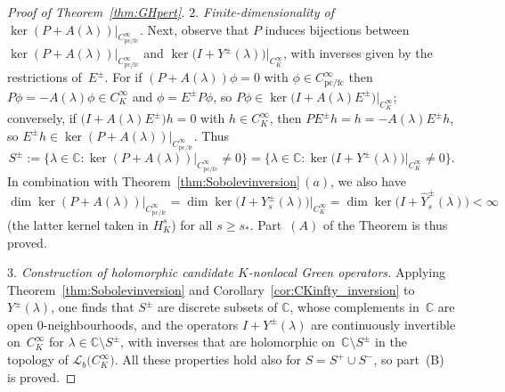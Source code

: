 \documentclass[11pt]{article}
\numberwithin{equation}{section}
\numberwithin{equation}{section}
\newcommand{\CC}{{\mathbb C}}
\newcommand{\fc}{\mathrm{fc}}
\newcommand{\pc}{\mathrm{pc}}
\newcommand{\LL}{{\mathcal L}}
\begin{document}
\begin{proof}[Proof of Theorem~\ref{thm:GHpert}]
 	\emph{$2.$ Finite-dimensionality of $\ker (P+ A(\lambda))|_{C^\infty_{\pc/\fc}}$.} Next, observe that $P$ induces bijections between $\ker (P+ A(\lambda))|_{C^\infty_{\pc/\fc}}$ and $\ker \big(I+ Y^{\pm}(\lambda)\big)\big|_{C^\infty_K}$,
 	with inverses given by the restrictions of~$E^{\pm}$. For
 	if $(P+ A(\lambda))\phi=0$ with $\phi\in C^\infty_{\pc/\fc}$ then
 	$P\phi=- A(\lambda)\phi\in C^\infty_K$ and $\phi=E^\pm P\phi$, so $P\phi\in\ker\big(I+ A(\lambda)E^\pm\big)\big|_{C^\infty_K}$; conversely, if $\big(I+ A(\lambda)E^\pm\big)h=0$ with
 	$h\in C^\infty_K$, then $PE^\pm h = h=- A(\lambda)E^\pm h$, so
 	$E^\pm h\in \ker(P+ A(\lambda))|_{C^\infty_{\pc/\fc}}$.
 	Thus
 	\begin{equation*}
 		S^\pm:= \big\{\lambda\in \CC\colon \ker (P+ A(\lambda))|_{C^\infty_{\pc/\fc}}\neq 0\big\}= \big\{\lambda\in \CC\colon \ker \big(I+ Y^{\pm}(\lambda)\big)\big|_{C^\infty_K}\neq 0\big\}.
 	\end{equation*}
 	In combination with Theorem~\ref{thm:Sobolevinversion}\,$(a)$, we also have
 	\begin{equation}\label{eq:GHpert_remark}
 		\dim \ker (P+A(\lambda))|_{C^\infty_{\pc/\fc}} = \dim \ker \big(I+Y_s^{\pm}(\lambda)\big)\big|_{C^\infty_{K}} = \dim \ker \big(I+\hat{Y}_s^{\pm}(\lambda)\big)<\infty
 	\end{equation}
 	\big(the latter kernel taken in $H^s_K$\big) for all $s\ge s_*$. Part~$(A)$ of the Theorem is thus proved.
 	
 	\emph{$3.$ Construction of holomorphic candidate $K$-nonlocal Green operators.} Applying Theorem~\ref{thm:Sobolevinversion} and Corollary~\ref{cor:CKinfty_inversion} to $Y^\pm(\lambda)$, one finds that $S^\pm$ are discrete subsets of $\CC$, whose complements in~$\CC$ are open $0$-neighbourhoods, and the operators $I+ Y^\pm(\lambda)$ are continuously invertible on~$C^\infty_K$ for $\lambda\in\CC\setminus S^\pm$, with inverses
 	that are holomorphic on~$\CC\setminus S^\pm$ in the topology
 	of $\LL_b\big(C^\infty_K\big)$. All these properties hold also for $S=S^+\cup S^-$,
 	so part~(B) is proved.
 	

\end{proof}
\end{document}
